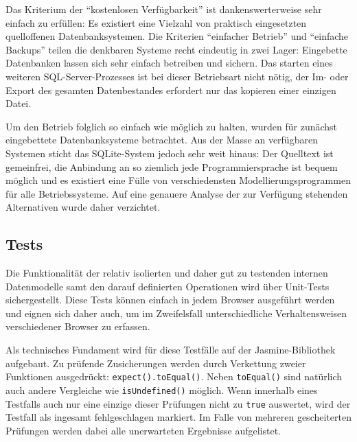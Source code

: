 Das Kriterium der "`kostenlosen Verfügbarkeit"' ist dankenswerterweise sehr einfach zu erfüllen: Es existiert eine Vielzahl von praktisch eingesetzten quelloffenen Datenbanksystemen. Die Kriterien "`einfacher Betrieb"' und "`einfache Backups"' teilen die denkbaren Systeme recht eindeutig in zwei Lager: Eingebette Datenbanken lassen sich sehr einfach betreiben und sichern. Das starten eines weiteren SQL-Server-Prozesses ist bei dieser Betriebsart nicht nötig, der Im- oder Export des gesamten Datenbestandes erfordert nur das kopieren einer einzigen Datei.

Um den Betrieb folglich so einfach wie möglich zu halten, wurden für \idename{} zunächst eingebettete Datenbanksysteme betrachtet. Aus der Masse an verfügbaren Systemen sticht das SQLite-System jedoch sehr weit hinaus: Der Quelltext ist gemeinfrei, die Anbindung an so ziemlich jede Programmiersprache ist bequem möglich und es existiert eine Fülle von verschiedensten Modellierungsprogrammen für alle Betriebssysteme. Auf eine genauere Analyse der zur Verfügung stehenden Alternativen wurde daher verzichtet.

\subsection{Tests}
\label{sec:implementation-tests}

Die Funktionalität der relativ isolierten und daher gut zu testenden internen Datenmodelle samt den darauf definierten Operationen wird über Unit-Tests sichergestellt. Diese Tests können einfach in jedem Browser ausgeführt werden und eignen sich daher auch, um im Zweifelsfall unterschiedliche Verhaltensweisen verschiedener Browser zu erfassen.

Als technisches Fundament wird für diese Testfälle auf der Jasmine-Bibliothek aufgebaut. Zu prüfende Zusicherungen werden durch Verkettung zweier Funktionen ausgedrückt: \texttt{expect().toEqual()}. Neben \texttt{toEqual()} sind natürlich auch andere Vergleiche wie \texttt{isUndefined()} möglich. Wenn innerhalb eines Testfalls auch nur eine einzige dieser Prüfungen nicht zu \texttt{true} auswertet, wird der Testfall als ingesamt fehlgeschlagen markiert. Im Falle von mehreren gescheiterten Prüfungen werden dabei alle unerwarteten Ergebnisse aufgelistet.



